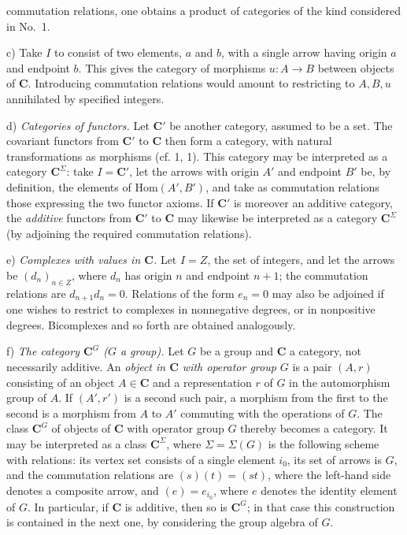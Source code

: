 
\noindent commutation relations, one obtains a product of categories of the
kind considered in No.~1.

c) Take $I$ to consist of two elements, $a$ and $b$, with a single
arrow having origin $a$ and endpoint $b$. This gives the category of
morphisms $u:A\to B$ between objects of $\mathbf{C}$. Introducing
commutation relations would amount to restricting to $A,B,u$ annihilated by
specified integers.

d) \textit{Categories of functors.} Let $\mathbf{C}'$ be another category,
assumed to be a set. The covariant functors from $\mathbf{C}'$ to $\mathbf{C}$ then form a
category, with natural transformations as morphisms (cf. 1, 1). This category
may be interpreted as a category $\mathbf{C}^\Sigma$: take $I=\mathbf{C}'$, let the arrows with
origin $A'$ and endpoint $B'$ be, by definition, the elements of
$\mathrm{Hom}(A',B')$, and take as commutation relations those expressing the
two functor axioms. If $\mathbf{C}'$ is moreover an additive category, the
\textit{additive} functors from $\mathbf{C}'$ to $\mathbf{C}$ may likewise be interpreted as a
category $\mathbf{C}^\Sigma$ (by adjoining the required commutation relations).

e) \textit{Complexes with values in $\mathbf{C}$.} Let $I=Z$, the
set of integers, and let the arrows be $(d_n)_{n\in Z}$, where $d_n$
has origin $n$ and endpoint $n+1$; the commutation relations are
$d_{n+1}d_n=0$. Relations of the form $e_n=0$ may also be adjoined if one
wishes to restrict to complexes in nonnegative degrees, or in nonpositive degrees.
Bicomplexes and so forth are obtained analogously.

f) \textit{The category $\mathbf{C}^G$ ($G$ a group).} Let $G$ be a group and
$\mathbf{C}$ a category, not necessarily additive. An \textit{object \textup{in $\mathbf{C}$} with
operator group $G$} is a pair $(A,r)$ consisting of an object $A\in \mathbf{C}$ and a
representation $r$ of $G$ in the automorphism group of $A$. If $(A',r')$ is a
second such pair, a morphism from the first to the second is a morphism from
$A$ to $A'$ commuting with the operations of $G$. The class $\mathbf{C}^G$ of objects
of $\mathbf{C}$ with operator group $G$ thereby becomes a category. It may be
interpreted as a class $\mathbf{C}^\Sigma$, where $\Sigma=\Sigma(G)$ is the following
scheme with relations: its vertex set consists of a single element $i_0$, its
set of arrows is $G$, and the commutation relations are $(s)(t)=(st)$, where
the left-hand side denotes a composite arrow, and $(e)=e_{i_0}$, where $e$
denotes the identity element of $G$. In particular, if $\mathbf{C}$ is additive, then
so is $\mathbf{C}^G$; in that case this construction is contained in the next one, by
considering the group algebra of $G$.

